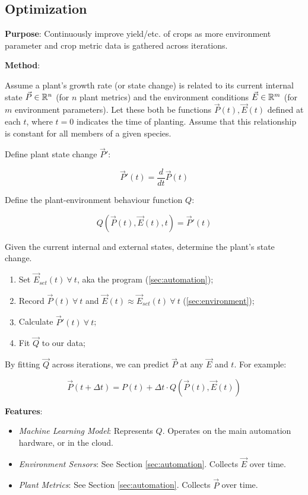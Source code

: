 \subsection{Optimization}
\label{sec:optimization}

\textbf{Purpose}: Continuously improve yield/etc. of crops as more environment parameter and crop metric data is gathered across iterations.

\textbf{Method}: 

Assume a plant's growth rate (or state change) is related to its current internal state $\vec P \in \mathbb R^n$ (for $n$ plant metrics) and the environment conditions $\vec E \in \mathbb R^m$ (for $m$ environment parameters). Let these both be functions $\vec P (t),\vec E(t)$ defined at each $t$, where $t=0$ indicates the time of planting. Assume that this relationship is constant for all members of a given species.

Define plant state change $\vec P'$: 

$$\vec P'(t) = \frac{d}{dt}\vec P(t)$$

Define the plant-environment behaviour function $Q$: 

$$Q(\vec P(t), \vec E(t), t)=\vec P'(t)$$ 

Given the current internal and external states, determine the plant's state change.

\begin{enumerate}
    \item Set $\vec E_{set}(t)~\forall~ t$, aka the program (\ref{sec:automation});
    \item Record $\vec P(t)~\forall~ t$ and $\vec E(t)\approx \vec E_{set}(t)~\forall~ t$ (\ref{sec:environment});
    \item Calculate $\vec P'(t)~\forall~ t$;
    \item Fit $\vec Q$ to our data;
\end{enumerate}

By fitting $\vec Q$ across iterations, we can predict $\vec P$ at any $\vec E$ and $t$. For example:

$$\vec P(t+\Delta t)=P(t)+\Delta t\cdot Q(\vec P(t),\vec E(t))$$

\textbf{Features}:
\begin{itemize}
    \item \textit{Machine Learning Model}: Represents $Q$. Operates on the main automation hardware, or in the cloud.
    \item \textit{Environment Sensors}: See Section \ref{sec:automation}. Collects $\vec E$ over time.
    \item \textit{Plant Metrics}: See Section \ref{sec:automation}. Collects $\vec P$ over time.
\end{itemize}